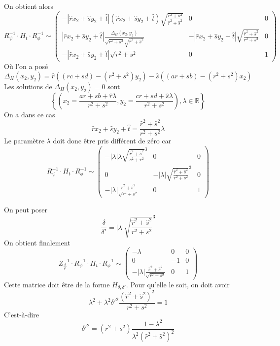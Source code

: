  On obtient alors 
\begin{equation*}
R_{\psi}^{-1} \cdot H_t \cdot R_{\phi}^{-1} \sim 
 \begin{pmatrix}
 -|\hat r x_2 +\hat s y_2 +\hat t|(\hat r x_2 +\hat s y_2 +\hat t)\sqrt{\frac{r^2 + s^2}{\hat r^2 + \hat s^2}}&0&0\\
 |\hat r x_2 +\hat s y_2 +\hat t|\frac{\Delta_H(x_2 , y_2)}{\sqrt{r^2 + s^2}\sqrt{\hat r^2 + \hat s^2}}&-|\hat r x_2 +\hat s y_2 +\hat t|\sqrt{\frac{\hat r^2 + \hat s^2}{r^2 + s^2}}&0\\
 -|\hat r x_2 +\hat s y_2 +\hat t|\sqrt{r^2 + s^2}&0&1
 \end{pmatrix}
\end{equation*}
Où l'on a posé 
\begin{equation*}
\Delta_H(x_2 , y_2 ) =\hat r ((rc+sd)-(r^2 + s^2)y_2) - \hat s ((ar+sb)-(r^2 + s^2 )x_2)
\end{equation*}
Les solutions de $\Delta_H(x_2 , y_2 )=0$ sont
\[ \left\lbrace \left( x_2=\frac{ar+sb+ \hat r \lambda}{r^2 +s^2}, y_2=\frac{cr+sd+\hat s \lambda}{r^2 +s^2}\right), \lambda \in \mathbb R \right\rbrace\]
On a dans ce cas
\begin{equation*}
\hat r x_2 +\hat s y_2 +\hat t = \frac{\hat r^2 +\hat s^2}{r^2 + s^2} \lambda
\end{equation*}
Le paramètre $\lambda$ doit donc être pris différent de zéro car 
\begin{equation*}
R_{\psi}^{-1} \cdot H_t \cdot R_{\phi}^{-1} \sim 
 \begin{pmatrix}
 -| \lambda | \lambda \sqrt{\frac{\hat r^2 + \hat s^2}{s^2 + r^2}}^{3}&0&0\\
0&-| \lambda | \sqrt{\frac{\hat r^2 + \hat s^2}{r^2 + s^2}}^{3}&0\\
 -|\lambda|\frac{\hat r^2 + \hat s^2}{\sqrt{r^2 + s^2}}&0&1
 \end{pmatrix}
\end{equation*}
 
 
 On peut poser 
 \begin{equation*}
 \frac{\delta}{\delta'}=|\lambda|\sqrt{\frac{\hat r^2 + \hat s^2}{r^2 + s^2}}^{3}
 \end{equation*}
On obtient finalement
\begin{equation*}
Z_{\frac{\delta}{\delta'}}^{-1} \cdot R_{\psi}^{-1} \cdot H_t \cdot R_{\phi}^{-1} \sim 
 \begin{pmatrix}
 -\lambda&0&0\\
0&-1&0\\
 -|\lambda|\frac{\hat r^2 + \hat s^2}{\sqrt{r^2 + s^2}}&0&1
 \end{pmatrix}
 \end{equation*}
 Cette matrice doit être de la forme $H_{\theta,\delta'}$. Pour qu'elle le soit, on doit avoir 
 \begin{equation*}
  \lambda^2 + \lambda^2 \delta'^2 \frac{(\hat r^2 + \hat s^2)^2}{r^2 + s^2}=1
 \end{equation*}
 C'est-à-dire
 \begin{equation*}
  \delta'^2 = (r^2 + s^2) \frac{1-\lambda^2}{\lambda^2 (\hat r^2+\hat s^2)^2}
 \end{equation*}

